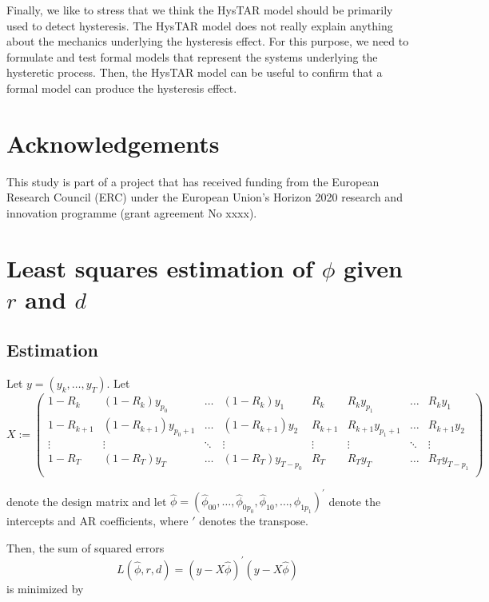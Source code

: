 \documentclass{article}
\begin{document}
Finally, we like to stress that we think the HysTAR model should be primarily used to detect hysteresis.
The HysTAR model does not really explain anything about the mechanics underlying the hysteresis effect.
For this purpose, we need to formulate and test formal models that represent the systems underlying the hysteretic process. Then, the HysTAR model can be useful to confirm that a formal model can produce the hysteresis effect.

\section{Acknowledgements}
This study is part of a project that has received funding from the European Research Council (ERC) under the European Union's Horizon 2020 research and innovation programme (grant agreement No xxxx).

\newpage




\newpage
\appendix
 
\section{Least squares estimation of $\phi$ given $r$ and $d$}

\subsection{Estimation} \label{app:estimation}
Let $y = (y_k, \dots, y_T)$.
Let
$$X := \begin{pmatrix}
1 - R_k & (1 - R_k) y_{p_0} &  \dots & (1 - R_k) y_1 &
R_k & R_k y_{p_1} & \dots & R_k y_1 \\
1 - R_{k+1} & (1 - R_{k+1}) y_{p_0+1} & \dots & (1 - R_{k+1}) y_2 &
R_{k+1} & R_{k+1} y_{p_1+1} & \dots & R_{k+1} y_2 \\
\vdots & \vdots & \ddots & \vdots & 
\vdots & \vdots & \ddots & \vdots \\
1 - R_T & (1 - R_T) y_T & \dots & (1 - R_T) y_{T-p_0} &
R_T & R_T y_T & \dots & R_T y_{T-p_1} \\
\end{pmatrix}$$

denote the design matrix and let
$\hat{\phi} = (\hat{\phi}_{00}, \dots, \hat{\phi}_{0 p_0}, \hat{\phi}_{10}, \dots, \hat{\phi}_{1 p_1})^\prime$
denote the intercepts and AR coefficients, where $\prime$ denotes the transpose.

Then, the sum of squared errors 
$$L(\hat{\phi}, r, d) = (y - X \hat{\phi})^\prime (y - X \hat{\phi})$$
is minimized by
\end{document}
